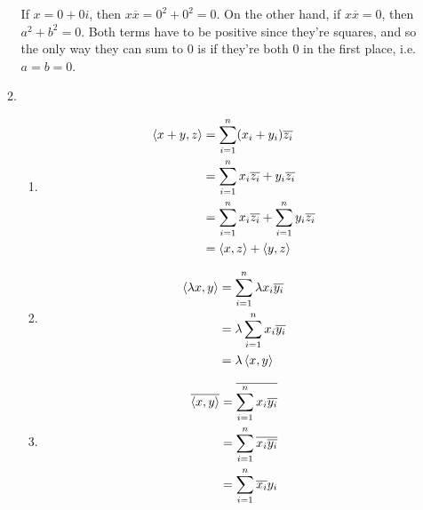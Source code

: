 \documentclass[12pt]{article}
\begin{document}
\begin{enumerate}
\begin{enumerate}
                        If $x=0+0i$, then $x\overline{x}=0^2+0^2=0$.
                        On the other hand, if $x\overline{x}=0$, then $a^2+b^2=0$.
                        Both terms have to be positive since they're squares,
                        and so the only way they can sum to $0$ is if they're both $0$
                        in the first place, i.e. $a=b=0$. \label{list:2c}

                  \item \begin{enumerate}
                              \item \begin{align*}
                                          \braket{x+y,z} & = \sum_{i=1}^{n} (x_i+y_i)\overline{z_i}                                \\
                                                         & = \sum_{i=1}^{n} x_i \overline{z_i} + y_i \overline{z_i}                \\
                                                         & = \sum_{i=1}^{n} x_i \overline{z_i} + \sum_{i=1}^{n} y_i \overline{z_i} \\
                                                         & = \braket{x,z}+\braket{y,z}
                                    \end{align*}
                              \item \begin{align*}
                                          \braket{\lambda x, y} & = \sum_{i=1}^{n} \lambda x_i \overline{y_i} \\
                                                                & = \lambda \sum_{i=1}^{n} x_i \overline{y_i} \\
                                                                & = \lambda \braket{x, y}
                                    \end{align*}
                              \item \begin{align*}
                                          \overline{\braket{x, y}} & = \overline{\sum_{i=1}^{n} x_i \overline{y_i}} \\
                                                                   & = \sum_{i=1}^{n} \overline{x_i \overline{y_i}} \\
                                                                   & = \sum_{i=1}^{n} \overline{x_i} y_i            \\

\end{align*}
\end{enumerate}
\end{enumerate}
\end{enumerate}
\end{document}
